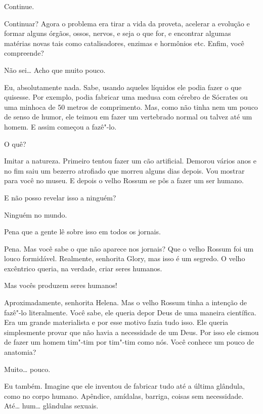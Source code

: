  Continue.

 Continuar? Agora o problema era tirar a vida da proveta, acelerar a
evolução e formar alguns órgãos, ossos, nervos, e seja o que for, e encontrar
algumas matérias novas tais como catalisadores, enzimas e hormônios etc.
Enfim, você compreende?

 Não sei\ldots{} Acho que muito pouco.

 Eu, absolutamente nada. Sabe, usando aqueles líquidos ele podia fazer o
que quisesse. Por exemplo, podia fabricar uma medusa com cérebro de Sócrates ou
uma minhoca de 50 metros de comprimento. Mas, como não tinha nem um pouco de
senso de humor, ele teimou em fazer um vertebrado normal ou talvez até um homem.
E assim começou a fazê"-lo.

 O quê?

 Imitar a natureza. Primeiro tentou fazer um cão artificial. Demorou
vários anos e no fim saiu um bezerro atrofiado que morreu alguns dias
depois. Vou mostrar para você no museu. E depois o velho Rossum se pôs a fazer
um ser humano.


 E não posso revelar isso a ninguém?

 Ninguém no mundo.

 Pena que a gente lê sobre isso em todos os jornais.

 Pena.  Mas você
sabe o que não aparece nos jornais?  Que o
velho Rossum foi um louco formidável. Realmente, senhorita Glory, mas isso é um
segredo. O velho excêntrico queria, na verdade, criar seres humanos.

 Mas vocês produzem seres humanos!

 Aproximadamente, senhorita Helena. Mas o velho Rossum tinha a intenção de
fazê"-lo literalmente. Você sabe, ele queria depor Deus de uma maneira
científica. Era um grande materialista e por esse motivo fazia tudo isso. Ele 
queria simplesmente provar que não havia a necessidade de um Deus. Por
isso ele cismou de fazer um homem tim"-tim por tim"-tim como nós. Você conhece um
pouco de anatomia?

 Muito\ldots{} pouco.

 Eu também. Imagine que ele inventou de fabricar tudo até a última glândula,
como no corpo humano. Apêndice, amídalas, barriga, coisas sem necessidade.
Até\ldots{} hum\ldots{} glândulas sexuais.

